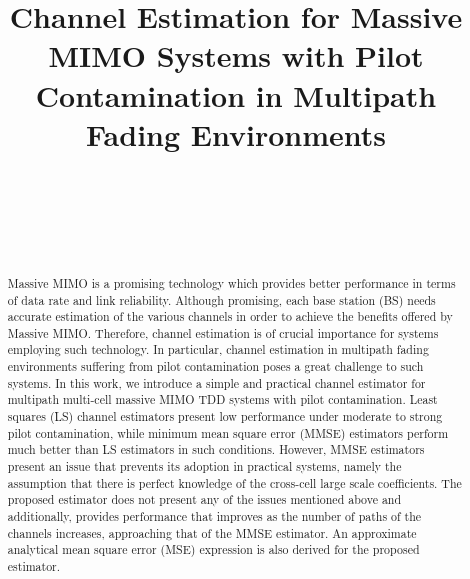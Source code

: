 \documentclass[10pt,journal,comsoc,final]{IEEEtran}
\begin{document}
\IEEEoverridecommandlockouts

\title{Channel Estimation for Massive MIMO Systems with Pilot Contamination in Multipath Fading Environments}

\author{
 \\
 \\
 \\
 \\
}

\maketitle

\begin{abstract}
Massive MIMO is a promising technology which provides better performance in terms of data rate and link reliability. Although promising, each base station (BS) needs accurate estimation of the various channels in order to achieve the benefits offered by Massive MIMO. Therefore, channel estimation is of crucial importance for systems employing such technology. In particular, channel estimation in multipath fading environments suffering from pilot contamination poses a great challenge to such systems. In this work, we introduce a simple and practical channel estimator for multipath multi-cell massive MIMO TDD systems with pilot contamination. Least squares (LS) channel estimators present low performance under moderate to strong pilot contamination, while minimum mean square error (MMSE) estimators perform much better than LS estimators in such conditions. However, MMSE estimators present an issue that prevents its adoption in practical systems, namely the assumption that there is perfect knowledge of the cross-cell large scale coefficients. The proposed estimator does not present any of the issues mentioned above and additionally, provides performance that improves as the number of paths of the channels increases, approaching that of the MMSE estimator. An approximate analytical mean square error (MSE) expression is also derived for the proposed estimator.
\end{abstract}
\end{document}

